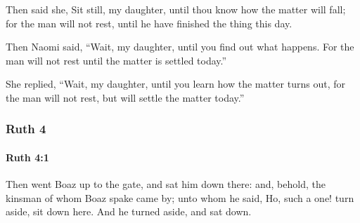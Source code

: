 			\begin{versebox}
					\item[BHS] 
					\item[LXX] 
					\item[ASV] Then said she, Sit still, my daughter, until thou know how the matter will fall; for the man will not rest, until he have finished the thing this day.
					\item[NIV] Then Naomi said, “Wait, my daughter, until you find out what happens. For the man will not rest until the matter is settled today.”
					\item[NRSV] She replied, “Wait, my daughter, until you learn how the matter turns out, for the man will not rest, but will settle the matter today.”
			\end{versebox}
	\subsubsection{Ruth 4} %
		\label{RUTH-4}

		\paragraph{Ruth 4:1} %
			\label{RUTH-4-1}

			Then went Boaz up to the gate, and sat him down there: and, behold, the kinsman of whom Boaz spake came by; unto whom he said, Ho, such a one! turn aside, sit down here. And he turned aside, and sat down.

